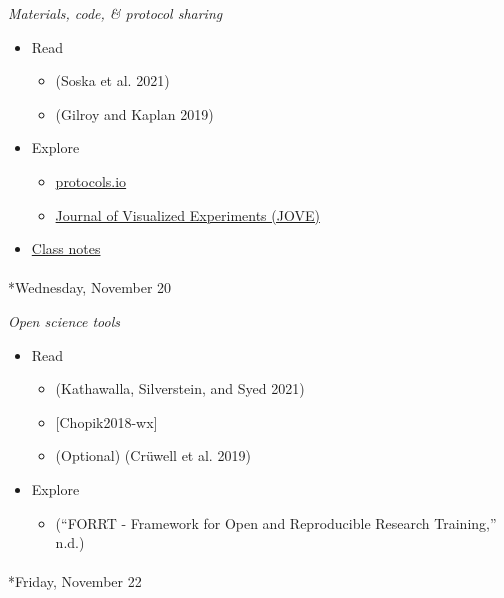 \documentclass[
  letterpaper,
  DIV=11,
  numbers=noendperiod]{scrartcl}
\makeatletter
\let\oldparagraph\paragraph
\renewcommand{\paragraph}{
    \@ifstar
      \xxxParagraphStar
      \xxxParagraphNoStar
  }
\newcommand{\xxxParagraphStar}[1]{\oldparagraph*{#1}\mbox{}}
\newcommand{\xxxParagraphNoStar}[1]{\oldparagraph{#1}\mbox{}}
\providecommand{\tightlist}{%
  \setlength{\itemsep}{0pt}\setlength{\parskip}{0pt}}\usepackage{longtable,booktabs,array}
\makeatother
\begin{document}
\emph{Materials, code, \& protocol sharing}

\begin{itemize}
\tightlist
\item
  Read

  \begin{itemize}
  \tightlist
  \item
    (Soska et al. 2021)
  \item
    (Gilroy and Kaplan 2019)
  \end{itemize}
\item
  Explore

  \begin{itemize}
  \tightlist
  \item
    \href{https://www.protocols.io/}{protocols.io}
  \item
    \href{https://www.jove.com/}{Journal of Visualized Experiments
    (JOVE)}
  \end{itemize}
\item
  \href{}{Class notes}
\end{itemize}

\paragraph*{Wednesday, November 20}\label{wednesday-november-20}

\emph{Open science tools}

\begin{itemize}
\tightlist
\item
  Read

  \begin{itemize}
  \tightlist
  \item
    (Kathawalla, Silverstein, and Syed 2021)
  \item
    {[}Chopik2018-wx{]}
  \item
    (Optional) (Crüwell et al. 2019)
  \end{itemize}
\item
  Explore

  \begin{itemize}
  \tightlist
  \item
    ({``{FORRT} - Framework for Open and Reproducible Research
    Training,''} n.d.)
  \end{itemize}
\end{itemize}

\paragraph*{Friday, November 22}\label{friday-november-22}
\end{document}
